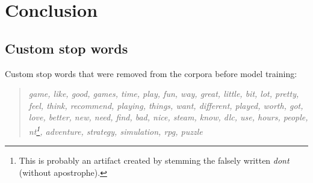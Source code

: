 \documentclass[11pt, a4paper]{article}
\newenvironment{itquote}
  {\begin{quote}\itshape}
  {\end{quote}\ignorespacesafterend}
\begin{document}
\section{Conclusion}\label{sec:conclusion}


\clearpage

\nocite{*}
\printbibliography

\clearpage

\begin{appendices}
\section{Custom stop words}\label{sec:stops}
Custom stop words that were removed from the corpora before model training:
\begin{itquote}
    game, like, good, games, time, play, fun, way, great, little, bit, lot, pretty, feel, think, recommend, playing,
    things, want, different, played, worth, got, love, better, new, need, find, bad, nice, steam, know, dlc, use, hours,
    people, nt\footnote{This is probably an artifact created by stemming the falsely written \textit{dont} (without
    apostrophe).}, adventure, strategy, simulation, rpg, puzzle
\end{itquote}
\end{appendices}
\end{document}
